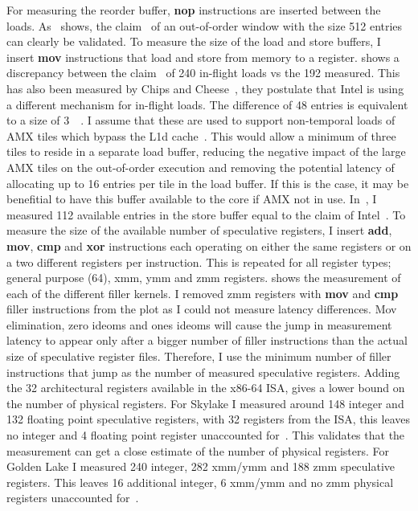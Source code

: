 For measuring the reorder buffer, \textbf{nop} instructions are inserted between the loads.
As~ shows, the claim~\cite{ServerTheHome_2023_SPR_Press,Wccftech_2023_SPR_Press} of an out-of-order window with the size \SI{512}{} entries can clearly be validated.
To measure the size of the load and store buffers, I insert \textbf{mov} instructions that load and store from memory to a register.
 shows a discrepancy between the claim~\cite{ServerTheHome_2023_SPR_Press,Wccftech_2023_SPR_Press} of 240 in-flight loads vs the 192 measured.
This has also been measured by Chips and Cheese~\cite{Chipsandcheese_2023_GoldenCove_Vector_Register}, they postulate that Intel is using a different mechanism for in-flight loads.
The difference of 48 entries is equivalent to a size of \SI{3}{\kibi\byte}.
I assume that these are used to support non-temporal loads of AMX tiles which bypass the L1d cache~\cite[Sec. 20.8]{Intel_Optimization_Reference_Manual_050}.
This would allow a minimum of three tiles to reside in a separate load buffer, reducing the negative impact of the large AMX tiles on the out-of-order execution and removing the potential latency of allocating up to 16 entries per tile in the load buffer.
If this is the case, it may be benefitial to have this buffer available to the core if AMX not in use.
In~, I measured 112 available entries in the store buffer equal to the claim of Intel~\cite{ServerTheHome_2023_SPR_Press,Wccftech_2023_SPR_Press}.
To measure the size of the available number of speculative registers, I insert \textbf{add}, \textbf{mov}, \textbf{cmp} and \textbf{xor} instructions each operating on either the same registers or on a two different registers per instruction.
This is repeated for all register types; general purpose (\SI{64}{\bit}), xmm, ymm and zmm registers.
 shows the measurement of each of the different filler kernels.
I removed zmm registers with \textbf{mov} and \textbf{cmp} filler instructions from the plot as I could not measure latency differences.
Mov elimination, zero ideoms and ones ideoms will cause the jump in measurement latency to appear only after a bigger number of filler instructions than the actual size of speculative register files.
Therefore, I use the minimum number of filler instructions that jump as the number of measured speculative registers.
Adding the 32 architectural registers available in the x86-64 ISA, gives a lower bound on the number of physical registers.
For Skylake I measured around 148 integer and 132 floating point speculative registers, with 32 registers from the ISA, this leaves no integer and 4 floating point register unaccounted for~\cite{Intel_2017_Skylake_SP}.
This validates that the measurement can get a close estimate of the number of physical registers.
For Golden Lake I measured 240 integer, 282 xmm/ymm and 188 zmm speculative registers.
This leaves 16 additional integer, 6 xmm/ymm and no zmm physical registers unaccounted for~\cite{ServerTheHome_2023_SPR_Press,Wccftech_2023_SPR_Press}.


